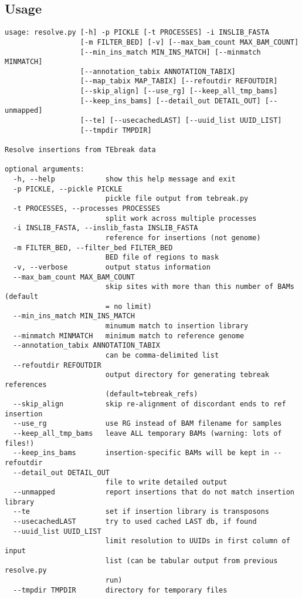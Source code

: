 \documentclass[letterpaper,11pt]{article}
\begin{document}
\subsection{Usage}
\begin{verbatim}
usage: resolve.py [-h] -p PICKLE [-t PROCESSES] -i INSLIB_FASTA
                  [-m FILTER_BED] [-v] [--max_bam_count MAX_BAM_COUNT]
                  [--min_ins_match MIN_INS_MATCH] [--minmatch MINMATCH]
                  [--annotation_tabix ANNOTATION_TABIX]
                  [--map_tabix MAP_TABIX] [--refoutdir REFOUTDIR]
                  [--skip_align] [--use_rg] [--keep_all_tmp_bams]
                  [--keep_ins_bams] [--detail_out DETAIL_OUT] [--unmapped]
                  [--te] [--usecachedLAST] [--uuid_list UUID_LIST]
                  [--tmpdir TMPDIR]

Resolve insertions from TEbreak data

optional arguments:
  -h, --help            show this help message and exit
  -p PICKLE, --pickle PICKLE
                        pickle file output from tebreak.py
  -t PROCESSES, --processes PROCESSES
                        split work across multiple processes
  -i INSLIB_FASTA, --inslib_fasta INSLIB_FASTA
                        reference for insertions (not genome)
  -m FILTER_BED, --filter_bed FILTER_BED
                        BED file of regions to mask
  -v, --verbose         output status information
  --max_bam_count MAX_BAM_COUNT
                        skip sites with more than this number of BAMs (default
                        = no limit)
  --min_ins_match MIN_INS_MATCH
                        minumum match to insertion library
  --minmatch MINMATCH   minimum match to reference genome
  --annotation_tabix ANNOTATION_TABIX
                        can be comma-delimited list
  --refoutdir REFOUTDIR
                        output directory for generating tebreak references
                        (default=tebreak_refs)
  --skip_align          skip re-alignment of discordant ends to ref insertion
  --use_rg              use RG instead of BAM filename for samples
  --keep_all_tmp_bams   leave ALL temporary BAMs (warning: lots of files!)
  --keep_ins_bams       insertion-specific BAMs will be kept in --refoutdir
  --detail_out DETAIL_OUT
                        file to write detailed output
  --unmapped            report insertions that do not match insertion library
  --te                  set if insertion library is transposons
  --usecachedLAST       try to used cached LAST db, if found
  --uuid_list UUID_LIST
                        limit resolution to UUIDs in first column of input
                        list (can be tabular output from previous resolve.py
                        run)
  --tmpdir TMPDIR       directory for temporary files

  
\end{verbatim}
\end{document}

